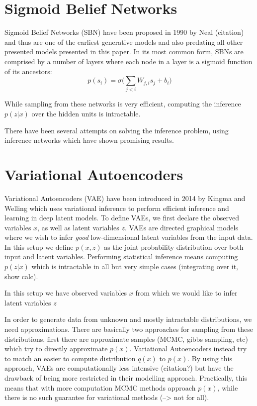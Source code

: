 \documentclass[twoside,11pt,a4paper]{article}
\theoremstyle{break}
\begin{document}
\section{Sigmoid Belief Networks}
\label{sec:sbn}
Sigmoid Belief Networks (SBN) have been proposed in 1990 by Neal (citation) and thus are one of the earliest generative models and also predating all other presented models presented in this paper.
In its most common form, SBNs are comprised by a number of layers where each node in a layer is a sigmoid function of its ancestors:
$$
p(s_i) = \sigma\bigg(\sum_{j<i}W_{j,i}s_j+b_i\bigg)
$$

While sampling from these networks is very efficient, computing the inference $p(z|x)$ over the hidden units is intractable.

There have been several attempts on solving the inference problem, using inference networks which have shown promising results.


\section{Variational Autoencoders}
\label{sec:vae}
Variational Autoencoders (VAE) have been introduced in 2014 by Kingma and Welling which uses variational inference to perform efficient inference and learning in deep latent models.
To define VAEs, we first declare the observed variables $x$, as well as latent variables $z$.
VAEs are directed graphical models where we wish to infer \emph{good} low-dimensional latent variables from the input data.
In this setup we define $p(x,z)$ as the joint probability distribution over both input and latent variables.
Performing statistical inference means computing $p(z|x)$ which is intractable in all but very simple cases (integrating over it, show calc).
 
In this setup we have observed variables $x$ from which we would like to infer latent variables $z$


In order to generate data from unknown and mostly intractable distributions, we need approximations.
There are basically two approaches for sampling from these distributions,
first there are approximate samples (MCMC, gibbs sampling, etc) which try to directly approximate $p(x)$.
Variational Autoencoders instead try to match an easier to compute distribution $q(x)$ to $p(x)$.
By using this approach, VAEs are computationally less intensive (citation?) but have the drawback of being more restricted in their modelling approach.
Practically, this means that with more computation MCMC methods approach $p(x)$, while there is no such guarantee for variational methods (--> not for all).
\end{document}
